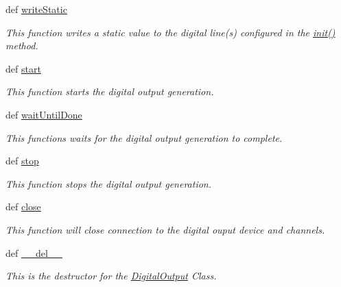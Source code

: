 \begin{DoxyCompactItemize}
def \hyperlink{class_chassis_8git_1_1_digital_output_1_1_digital_output_af3640c99351422417698e41b9d18f467}{write\-Static}
\begin{DoxyCompactList}\small\item\em This function writes a static value to the digital line(s) configured in the \hyperlink{class_chassis_8git_1_1_digital_output_1_1_digital_output_adf35fabba6014d608be1250b5046f6a2}{init()} method. \end{DoxyCompactList}\item 
def \hyperlink{class_chassis_8git_1_1_digital_output_1_1_digital_output_a1564f645624ff164cf402b0d5dd07c0c}{start}
\begin{DoxyCompactList}\small\item\em This function starts the digital output generation. \end{DoxyCompactList}\item 
def \hyperlink{class_chassis_8git_1_1_digital_output_1_1_digital_output_a69988683bd514cf79aef357f62542889}{wait\-Until\-Done}
\begin{DoxyCompactList}\small\item\em This functions waits for the digital output generation to complete. \end{DoxyCompactList}\item 
def \hyperlink{class_chassis_8git_1_1_digital_output_1_1_digital_output_a25ea5c7440311f73c1ae463da9c57211}{stop}
\begin{DoxyCompactList}\small\item\em This function stops the digital output generation. \end{DoxyCompactList}\item 
def \hyperlink{class_chassis_8git_1_1_digital_output_1_1_digital_output_ad13b6aba032d6fcf7da28e2098d08d11}{close}
\begin{DoxyCompactList}\small\item\em This function will close connection to the digital ouput device and channels. \end{DoxyCompactList}\item 
def \hyperlink{class_chassis_8git_1_1_digital_output_1_1_digital_output_a51e94cf4bda8d8f5df3c5c1baab827b3}{\-\_\-\-\_\-del\-\_\-\-\_\-}
\begin{DoxyCompactList}\small\item\em This is the destructor for the \hyperlink{class_chassis_8git_1_1_digital_output_1_1_digital_output}{Digital\-Output} Class. \end{DoxyCompactList}\end{DoxyCompactItemize}
